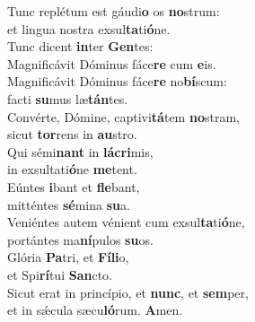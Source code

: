 \evenverse Tunc replétum est gáudi\textbf{o} os \textbf{no}strum:~\*\\
\evenverse et lingua nostra exsul\textbf{ta}ti\textbf{ó}ne.\\
\oddverse Tunc dicent \textbf{in}ter \textbf{Gen}tes:~\*\\
\oddverse Magnificávit Dóminus fáce\textbf{re} cum \textbf{e}is.\\
\evenverse Magnificávit Dóminus fáce\textbf{re} no\textbf{bí}scum:~\*\\
\evenverse facti \textbf{su}mus læ\textbf{tán}tes.\\
\oddverse Convérte, Dómine, captivi\textbf{tá}tem \textbf{no}stram,~\*\\
\oddverse sicut \textbf{tor}rens in \textbf{au}stro.\\
\evenverse Qui sémi\textbf{nant} in \textbf{lá}\textbf{cri}mis,~\*\\
\evenverse in exsultati\textbf{ó}ne \textbf{me}tent.\\
\oddverse Eúntes \textbf{i}bant et \textbf{fle}bant,~\*\\
\oddverse mitténtes \textbf{sé}mina \textbf{su}a.\\
\evenverse Veniéntes autem vénient cum exsul\textbf{ta}ti\textbf{ó}ne,~\*\\
\evenverse portántes ma\textbf{ní}pulos \textbf{su}os.\\
\oddverse Glória \textbf{Pa}tri, et \textbf{Fí}\textbf{li}o,~\*\\
\oddverse et Spi\textbf{rí}tui \textbf{San}cto.\\
\evenverse Sicut erat in princípio, et \textbf{nunc}, et \textbf{sem}per,~\*\\
\evenverse et in sǽcula sæcu\textbf{ló}rum. \textbf{A}men.\\
